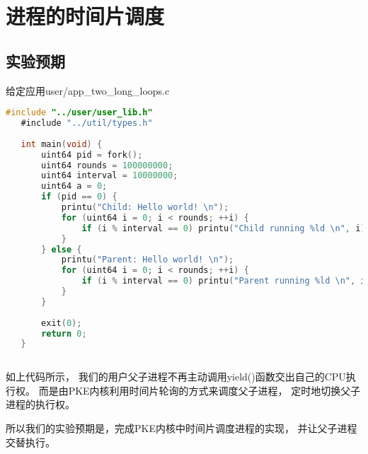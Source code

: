 \section{进程的时间片调度}

\subsection{实验预期}

给定应用user/app\_two\_long\_loops.c

\begin{lstlisting}[caption={用户态应用app\_two\_long\_loops.c}, label={lst:app_two_long_loops}, language=C]
   #include "../user/user_lib.h"
   #include "../util/types.h"
   
   int main(void) {
       uint64 pid = fork();
       uint64 rounds = 100000000;
       uint64 interval = 10000000;
       uint64 a = 0;
       if (pid == 0) {
           printu("Child: Hello world! \n");
           for (uint64 i = 0; i < rounds; ++i) {
               if (i % interval == 0) printu("Child running %ld \n", i);
           }
       } else {
           printu("Parent: Hello world! \n");
           for (uint64 i = 0; i < rounds; ++i) {
               if (i % interval == 0) printu("Parent running %ld \n", i);
           }
       }
   
       exit(0);
       return 0;
   }
       
\end{lstlisting}

如上代码所示，
我们的用户父子进程不再主动调用yield()函数交出自己的CPU执行权。
而是由PKE内核利用时间片轮询的方式来调度父子进程，
定时地切换父子进程的执行权。

所以我们的实验预期是，完成PKE内核中时间片调度进程的实现，
并让父子进程交替执行。

